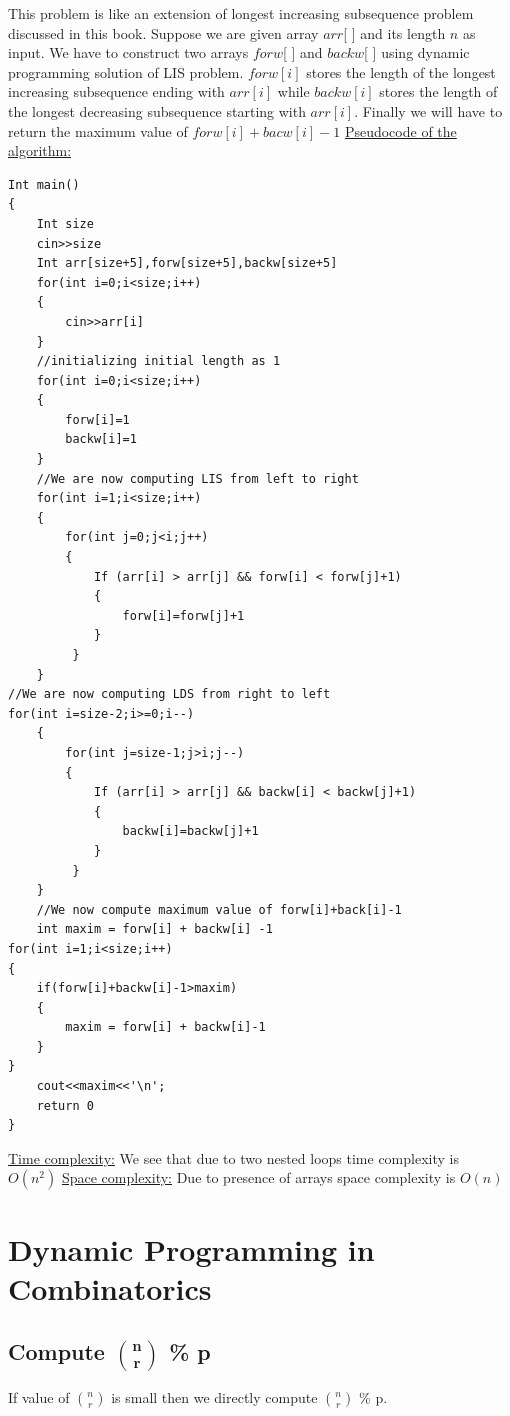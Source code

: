 \documentclass[12pt]{book}
\begin{document}
This problem is like an extension of longest increasing subsequence problem discussed in this book. Suppose we are given array $arr$[ ] and its length $n$ as input. We have to construct two arrays $forw$[ ] and $backw$[ ] using dynamic programming solution of LIS problem. $forw[i]$ stores the length of the longest increasing subsequence ending with $arr[i]$ while $backw[i]$ stores the length of the longest decreasing subsequence starting with $arr[i]$. Finally we will have to return the maximum value of $forw[i] + bacw[i] - 1$\newline\newline
\underline{Pseudocode of the algorithm:}\newline\newline
\begin{lstlisting}
Int main()
{
	Int size
	cin>>size
	Int arr[size+5],forw[size+5],backw[size+5]
	for(int i=0;i<size;i++)
	{
		cin>>arr[i]
	}
	//initializing initial length as 1
	for(int i=0;i<size;i++)
	{
		forw[i]=1   
		backw[i]=1
	}
	//We are now computing LIS from left to right
	for(int i=1;i<size;i++)
	{
		for(int j=0;j<i;j++)
		{
			If (arr[i] > arr[j] && forw[i] < forw[j]+1)
			{
				forw[i]=forw[j]+1
			}
		 }
	}
//We are now computing LDS from right to left
for(int i=size-2;i>=0;i--)
	{
		for(int j=size-1;j>i;j--)
		{
			If (arr[i] > arr[j] && backw[i] < backw[j]+1)
			{
				backw[i]=backw[j]+1
			}
		 }
	}
	//We now compute maximum value of forw[i]+back[i]-1
	int maxim = forw[i] + backw[i] -1
for(int i=1;i<size;i++)
{
	if(forw[i]+backw[i]-1>maxim)
	{
		maxim = forw[i] + backw[i]-1
	}
}
	cout<<maxim<<'\n';
	return 0
}
\end{lstlisting}

\underline{Time complexity:}\newline
We see that due to  two nested loops time complexity is $O(n^2)$\newline\newline
\underline{Space complexity:}\newline
Due to presence of arrays space complexity is $O(n)$\newline\newline

\chapter{Dynamic Programming in Combinatorics}

\section{Compute $\mathbf{n \choose r}$ \textbf{\% p}}
If value of $n \choose r$ is small then we directly compute $n \choose r$ \% p.\\
\end{document}
